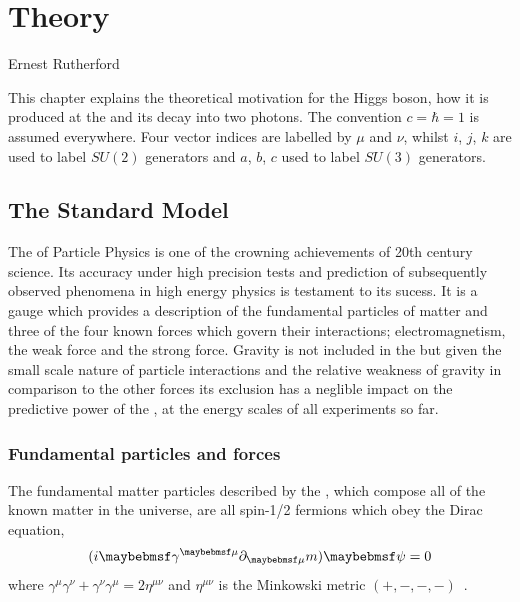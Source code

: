 \chapter{Theory}
\label{chap:theory}
{Ernest Rutherford}

This chapter explains the theoretical motivation for the Higgs boson, how it is produced at the \LHC and its decay into two photons. The convention $c=\hbar=1$ is assumed everywhere. Four vector indices are labelled by $\mu$ and $\nu$, whilst $i$, $j$, $k$ are used to label $SU(2)$ generators and $a$, $b$, $c$ used to label $SU(3)$ generators.

\section{The Standard Model}
\label{sec:standardmodel}

The \SM of Particle Physics is one of the crowning achievements of 20th century science. Its accuracy under high precision tests and prediction of subsequently observed phenomena in high energy physics is testament to its sucess. It is a gauge \QFT which provides a description of the fundamental particles of matter and three of the four known forces which govern their interactions; electromagnetism, the weak force and the strong force. Gravity is not included in the \SM but given the small scale nature of particle interactions and the relative weakness of gravity in comparison to the other forces its exclusion has a neglible impact on the predictive power of the \SM, at the energy scales of all experiments so far. 

\subsection{Fundamental particles and forces}

The fundamental matter particles described by the \SM, which compose all of the known matter in the universe, are all spin-1/2 fermions which obey the Dirac equation,
\begin{equation}
  (i\gamma^{\mu}\partial_{\mu}\-m)\psi=0
  \label{eq:dirac}
\end{equation}
where $\gamma^{\mu}\gamma^{\nu}+\gamma^{\nu}\gamma^{\mu}=2\eta^{\mu\nu}$ and $\eta^{\mu\nu}$ is the Minkowski metric $(+,-,-,-)$~\cite{Halzen}.

